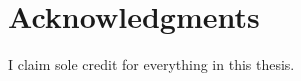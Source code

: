 \documentclass[a4paper,11pt,twoside]{ThesisStyle}
\begin{document}


\section*{Acknowledgments}

I claim sole credit for everything in this thesis.

\newpage

\tableofcontents
\mainmatter






% 

\listoffigures
%  
\listoftables




\end{document}

